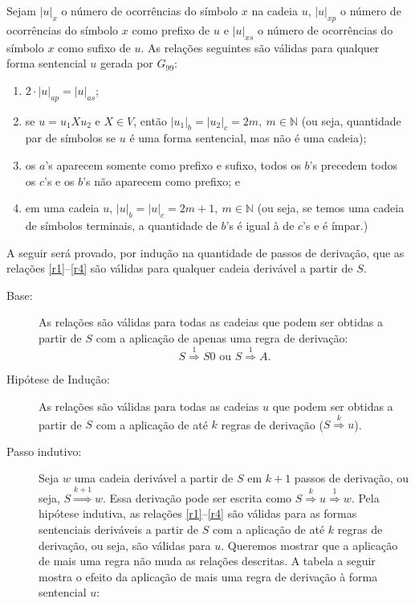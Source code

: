 \documentclass[12pt]{article}
\def\myling{{19}} %
\newcommand{\deriv}[1]{\stackrel{\scriptscriptstyle #1}{\Longrightarrow}}
\begin{document}
\begin{tcolorbox}[breakable,rounded corners, colback=yellow!5, colframe=red!40!black, title={$\mathcal{L}(G_{99})\subseteq \mathcal{L}_{\myling}$, ou seja, se $S \deriv{*} w$, então $w = a^nb^{2m+1}c^{2m+1}a^{2n},\ n,m \geqslant 0$.}]
Sejam $|u|_x$ o número de ocorrências do símbolo $x$ na cadeia $u$, $|u|_{xp}$ o número de ocorrências do símbolo $x$ como prefixo de $u$ e $|u|_{xs}$ o número de ocorrências do símbolo $x$ como sufixo de $u$.
 As relações seguintes são válidas para qualquer forma sentencial $u$ gerada por $G_{99}$:
\begin{enumerate}[label=(\roman*),ref=(\roman*)]
	\item \label{r1} $2\cdot |u|_{ap} = |u|_{as}$;
	\item \label{r2} se $u=u_1Xu_2$ e $X \in V$, então $|u_1|_{b}=|u_2|_{c}=2m,\ m \in \mathbb{N}$ (ou seja, quantidade par de símbolos se $u$ é uma forma sentencial, mas não é uma cadeia);
	\item \label{r3} os $a$'s aparecem somente como prefixo e sufixo, todos os $b$'s precedem todos os $c$'s e os $b$'s não aparecem como prefixo; e
	\item \label{r4} em uma cadeia $u$, $|u|_{b}=|u|_{c}= 2m+1, \ m \in \mathbb{N}$ (ou seja, se temos uma cadeia de símbolos terminais, a quantidade de $b$'s é igual à de $c$'s e é ímpar.)
\end{enumerate}
 A seguir será provado, por indução na quantidade de passos de derivação, que as relações \ref{r1}--\ref{r4} são válidas para qualquer cadeia derivável a partir de $S$.
\begin{description}
	\item[Base:] As relações são válidas para todas as cadeias que podem ser obtidas a partir de $S$ com a aplicação de apenas uma regra de derivação: 
	$$S \deriv{1} S0\text{ ou }S \deriv{1} A.$$	
	\item[Hipótese de Indução:] As relações são válidas para todas as cadeias $u$ que podem ser obtidas a partir de $S$ com a aplicação de até $k$ regras de derivação ($S \deriv{k}u$).
	\item[Passo indutivo:] Seja $w$ uma cadeia derivável a partir de $S$ em $k+1$ passos de derivação, ou seja, $S \deriv{k+1}w$. Essa derivação pode ser escrita como $S \deriv{k}u \deriv{1}w$. Pela hipótese indutiva, as relações \ref{r1}--\ref{r4} são válidas para as formas sentenciais deriváveis a partir de $S$ com a aplicação de até $k$ regras de derivação, ou seja, são válidas para $u$. Queremos mostrar que a aplicação de mais uma regra não muda as relações descritas. A tabela a seguir mostra o efeito da aplicação de mais uma regra de derivação à forma sentencial $u$:

\end{description}
\end{tcolorbox}
\end{document}
